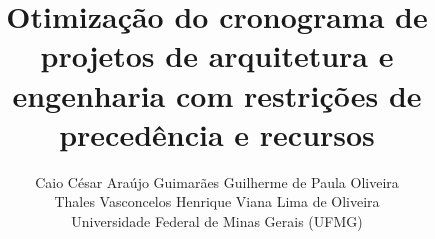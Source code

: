 
\title{Otimização do cronograma de projetos de arquitetura e engenharia
com restrições de precedência e recursos}

\author{%
  \normalsize Caio César Araújo Guimarães \quad Guilherme de Paula Oliveira\\
  \normalsize Thales Vasconcelos \quad Henrique Viana Lima de Oliveira\\[0.4em]
  \small Universidade Federal de Minas Gerais (UFMG)
}
\date{}
